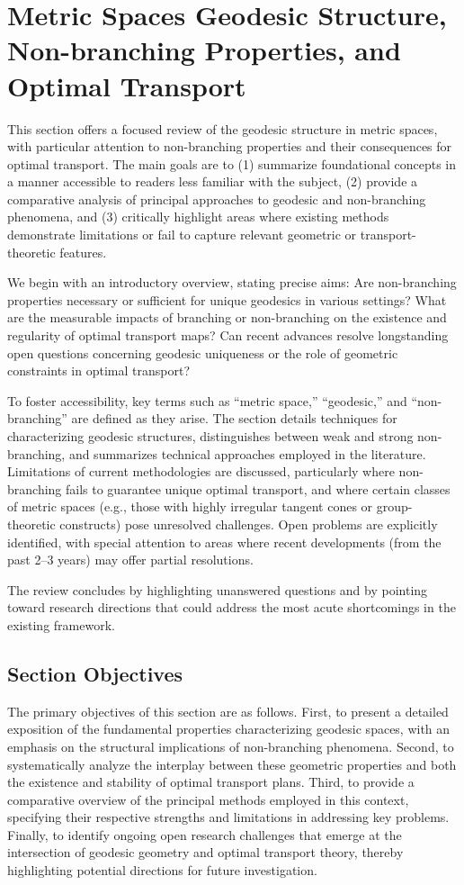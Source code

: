 \documentclass[sigconf]{acmart}
\begin{document}
\section{Metric Spaces Geodesic Structure, Non-branching Properties, and Optimal Transport}

This section offers a focused review of the geodesic structure in metric spaces, with particular attention to non-branching properties and their consequences for optimal transport. The main goals are to (1) summarize foundational concepts in a manner accessible to readers less familiar with the subject, (2) provide a comparative analysis of principal approaches to geodesic and non-branching phenomena, and (3) critically highlight areas where existing methods demonstrate limitations or fail to capture relevant geometric or transport-theoretic features.

We begin with an introductory overview, stating precise aims: 
Are non-branching properties necessary or sufficient for unique geodesics in various settings? What are the measurable impacts of branching or non-branching on the existence and regularity of optimal transport maps? Can recent advances resolve longstanding open questions concerning geodesic uniqueness or the role of geometric constraints in optimal transport?

To foster accessibility, key terms such as ``metric space,'' ``geodesic,'' and ``non-branching'' are defined as they arise. The section details techniques for characterizing geodesic structures, distinguishes between weak and strong non-branching, and summarizes technical approaches employed in the literature. Limitations of current methodologies are discussed, particularly where non-branching fails to guarantee unique optimal transport, and where certain classes of metric spaces (e.g., those with highly irregular tangent cones or group-theoretic constructs) pose unresolved challenges. Open problems are explicitly identified, with special attention to areas where recent developments (from the past 2--3 years) may offer partial resolutions.

The review concludes by highlighting unanswered questions and by pointing toward research directions that could address the most acute shortcomings in the existing framework.

\subsection*{Section Objectives}
The primary objectives of this section are as follows.
First, to present a detailed exposition of the fundamental properties characterizing geodesic spaces, with an emphasis on the structural implications of non-branching phenomena. Second, to systematically analyze the interplay between these geometric properties and both the existence and stability of optimal transport plans. Third, to provide a comparative overview of the principal methods employed in this context, specifying their respective strengths and limitations in addressing key problems. Finally, to identify ongoing open research challenges that emerge at the intersection of geodesic geometry and optimal transport theory, thereby highlighting potential directions for future investigation.
\end{document}
